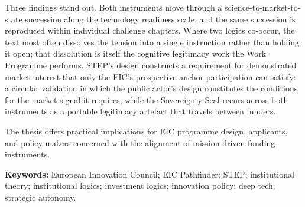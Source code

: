 Three findings stand out. Both instruments move through a
science-to-market-to-state succession along the technology readiness scale,
and the same succession is reproduced within individual challenge chapters.
Where two logics co-occur, the text most often dissolves the tension into a
single instruction rather than holding it open; that dissolution is itself
the cognitive legitimacy work the Work Programme performs. STEP's design
constructs a requirement for demonstrated market interest that only the
EIC's prospective anchor participation can satisfy: a circular
validation in which the public actor's design constitutes the
conditions for the market signal it requires, while the Sovereignty Seal recurs across both instruments as
a portable legitimacy artefact that travels between funders.

The thesis offers practical implications for EIC programme design,
applicants, and policy makers concerned with the alignment of
mission-driven funding instruments.

\vspace{0.4cm}
\noindent\textbf{Keywords:} European Innovation Council; EIC Pathfinder;
STEP; institutional theory; institutional logics; investment logics;
innovation policy; deep tech; strategic autonomy.
